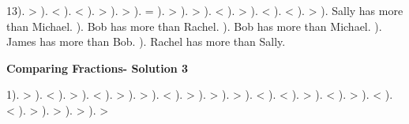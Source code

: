 \documentclass{article}%
\begin{document}
13). >%
). <%
). <%
). >%
). >%
). =%
). >%
). >%
). <%
). >%
). <%
). <%
). >%
). Sally has more than Michael.%
). Bob has more than Rachel.%
). Bob has more than Michael.%
). James has more than Bob.%
). Rachel has more than Sally.%
\newline%
\newpage%
\large%
\begin{center}%
\textbf{Comparing Fractions- Solution 3}%
\newline%
\end{center} \normalsize%
1). >%
). <%
). >%
). <%
). >%
). >%
). <%
). >%
). >%
). >%
). <%
). <%
). >%
). <%
). >%
). <%
). <%
). >%
). >%
). >%
). >%
\newline%
\end{document}
